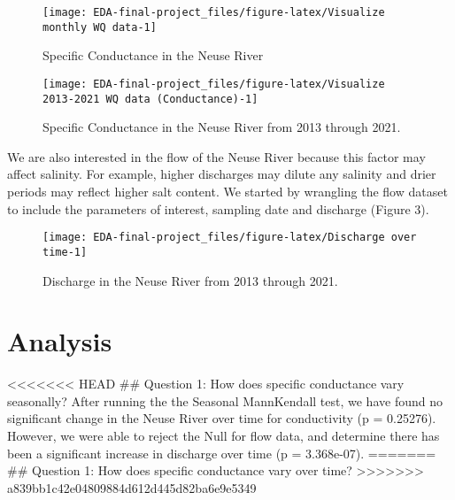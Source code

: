\documentclass[
  12pt,
]{article}
\begin{document}
\begin{figure}

\texttt{[image: EDA-final-project\_files/figure-latex/Visualize monthly WQ data-1]} \hfill{}

\caption{Specific Conductance in the Neuse River}\label{fig:Visualize monthly WQ data}
\end{figure}

\begin{figure}

\texttt{[image: EDA-final-project\_files/figure-latex/Visualize 2013-2021 WQ data (Conductance)-1]} \hfill{}

\caption{Specific Conductance in the Neuse River from 2013 through 2021.}\label{fig:Visualize 2013-2021 WQ data (Conductance)}
\end{figure}

\newpage

We are also interested in the flow of the Neuse River because this
factor may affect salinity. For example, higher discharges may dilute
any salinity and drier periods may reflect higher salt content. We
started by wrangling the flow dataset to include the parameters of
interest, sampling date and discharge (Figure 3).

\begin{figure}

\texttt{[image: EDA-final-project\_files/figure-latex/Discharge over time-1]} \hfill{}

\caption{Discharge in the Neuse River from 2013 through 2021.}\label{fig:Discharge over time}
\end{figure}

\newpage

\hypertarget{analysis}{%
\section{Analysis}\label{analysis}}

\textless\textless\textless\textless\textless\textless\textless{} HEAD
\#\# Question 1: How does specific conductance vary seasonally? After
running the the Seasonal MannKendall test, we have found no significant
change in the Neuse River over time for conductivity (p = 0.25276).
However, we were able to reject the Null for flow data, and determine
there has been a significant increase in discharge over time (p =
3.368e-07). ======= \#\# Question 1: How does specific conductance vary
over time?
\textgreater\textgreater\textgreater\textgreater\textgreater\textgreater\textgreater{}
a839bb1c42e04809884d612d445d82ba6e9e5349
\end{document}
